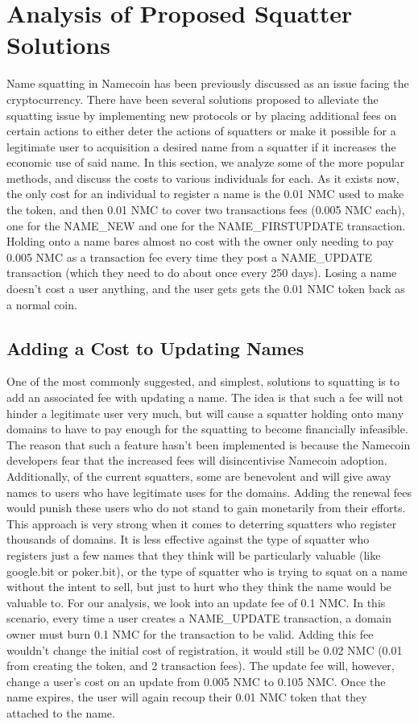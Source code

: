 \section{Analysis of Proposed Squatter Solutions}
\label{sec:analysis}

    Name squatting in Namecoin has been previously discussed as an issue facing the cryptocurrency. There have been several solutions proposed to alleviate the squatting issue by implementing new protocols or by placing additional fees on certain actions to either deter the actions of squatters or make it possible for a legitimate user to acquisition a desired name from a squatter if it increases the economic use of said name. In this section, we analyze some of the more popular methods, and discuss the costs to various individuals for each. 
    As it exists now, the only cost for an individual to register a name is the 0.01 NMC used to make the token, and then 0.01 NMC to cover two transactions fees (0.005 NMC each), one for the NAME\_NEW and one for the NAME\_FIRSTUPDATE transaction. Holding onto a name bares almost no cost with the owner only needing to pay 0.005 NMC as a transaction fee every time they post a NAME\_UPDATE transaction (which they need to do about once every 250 days). Losing a name doesn't cost a user anything, and the user gets gets the 0.01 NMC token back as a normal coin. 

\subsection{Adding a Cost to Updating Names}
    One of the most commonly suggested, and simplest, solutions to squatting is to add an associated fee with updating a name. The idea is that such a fee will not hinder a legitimate user very much, but will cause a squatter holding onto many domains to have to pay enough for the squatting to become financially infeasible. The reason that such a feature hasn't been implemented is because the Namecoin developers fear that the increased fees will disincentivise Namecoin adoption. Additionally, of the current squatters, some are benevolent and will give away names to users who have legitimate uses for the domains. Adding the renewal fees would punish these users who do not stand to gain monetarily from their efforts. This approach is very strong when it comes to deterring squatters who register thousands of domains. It is less effective against the type of squatter who registers just a few names that they think will be particularly valuable (like google.bit or poker.bit), or the type of squatter who is trying to squat on a name without the intent to sell, but just to hurt who they think the name would be valuable to.
For our analysis, we look into an update fee of 0.1 NMC. In this scenario, every time a user creates a NAME\_UPDATE transaction, a domain owner must burn 0.1 NMC for the transaction to be valid. Adding this fee wouldn't change the initial cost of registration, it would still be 0.02 NMC (0.01 from creating the token, and 2 transaction fees). The update fee will, however, change a user's cost on an update from 0.005 NMC to 0.105 NMC. Once the name expires, the user will again recoup their 0.01 NMC token that they attached to the name. 

